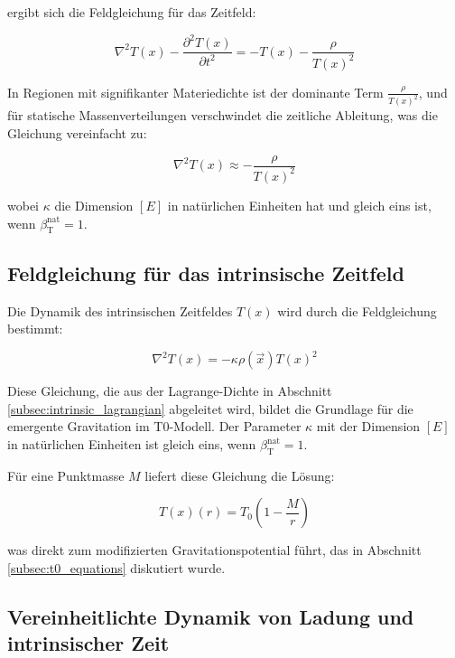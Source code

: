 \documentclass[12pt,a4paper]{article}
\newcommand{\Tfield}{T(x)}
\newcommand{\betaT}{\beta_{\text{T}}}
\newcommand{\Tzero}{T_0}
\newcommand{\vecx}{\vec{x}}
\begin{document}
	ergibt sich die Feldgleichung für das Zeitfeld:
	
	\begin{equation}
		\nabla^2 \Tfield - \frac{\partial^2 \Tfield}{\partial t^2} = -\Tfield - \frac{\rho}{\Tfield^2}
	\end{equation}
	
	In Regionen mit signifikanter Materiedichte ist der dominante Term $\frac{\rho}{\Tfield^2}$, und für statische Massenverteilungen verschwindet die zeitliche Ableitung, was die Gleichung vereinfacht zu:
	
	\begin{equation}
		\nabla^2 \Tfield \approx -\frac{\rho}{\Tfield^2}
	\end{equation}
	
	wobei $\kappa$ die Dimension $[E]$ in natürlichen Einheiten hat und gleich eins ist, wenn $\betaT^{\text{nat}} = 1$.
	
	\subsection{Feldgleichung für das intrinsische Zeitfeld}
	\label{subsec:field_equation_time}
	
	Die Dynamik des intrinsischen Zeitfeldes $\Tfield$ wird durch die Feldgleichung bestimmt:
	
	\begin{equation}
		\nabla^2 \Tfield = -\kappa \rho(\vecx) \Tfield^2
	\end{equation}
	
	Diese Gleichung, die aus der Lagrange-Dichte in Abschnitt \ref{subsec:intrinsic_lagrangian} abgeleitet wird, bildet die Grundlage für die emergente Gravitation im T0-Modell. Der Parameter $\kappa$ mit der Dimension $[E]$ in natürlichen Einheiten ist gleich eins, wenn $\betaT^{\text{nat}} = 1$.
	
	Für eine Punktmasse $M$ liefert diese Gleichung die Lösung:
	
	\begin{equation}
		\Tfield(r) = \Tzero \left(1 - \frac{M}{r}\right)
	\end{equation}
	
	was direkt zum modifizierten Gravitationspotential führt, das in Abschnitt \ref{subsec:t0_equations} diskutiert wurde.
	
	\subsection{Vereinheitlichte Dynamik von Ladung und intrinsischer Zeit}
	\label{subsec:unified_dynamics}
	
\end{document}
